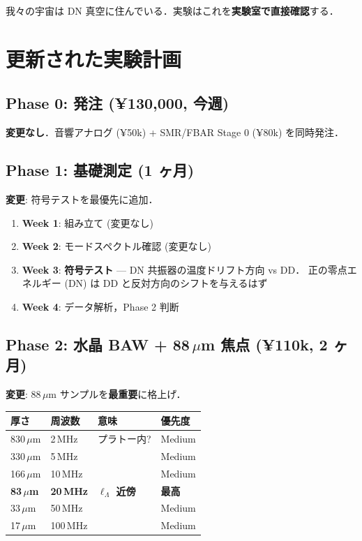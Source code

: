 \documentclass[11pt,a4paper]{article}
\begin{document}
我々の宇宙は DN 真空に住んでいる．実験はこれを\textbf{実験室で直接確認}する．

\section{更新された実験計画}

\subsection{Phase 0: 発注 (¥130,000, 今週)}

\textbf{変更なし}．音響アナログ (¥50k) + SMR/FBAR Stage 0 (¥80k) を同時発注．

\subsection{Phase 1: 基礎測定 (1 ヶ月)}

\textbf{変更}: 符号テストを最優先に追加．

\begin{enumerate}
\item \textbf{Week 1}: 組み立て (変更なし)
\item \textbf{Week 2}: モードスペクトル確認 (変更なし)
\item \textbf{Week 3}: \textbf{符号テスト} — DN 共振器の温度ドリフト方向 vs DD．
正の零点エネルギー (DN) は DD と反対方向のシフトを与えるはず
\item \textbf{Week 4}: データ解析，Phase 2 判断
\end{enumerate}

\subsection{Phase 2: 水晶 BAW + 88\,$\mu$m 焦点 (¥110k, 2 ヶ月)}

\textbf{変更}: 88\,$\mu$m サンプルを\textbf{最重要}に格上げ．

\begin{center}
\begin{tabular}{llll}
\toprule
厚さ & 周波数 & 意味 & 優先度 \\
\midrule
830\,$\mu$m & 2\,MHz & プラトー内? & Medium \\
330\,$\mu$m & 5\,MHz & & Medium \\
166\,$\mu$m & 10\,MHz & & Medium \\
\textbf{83\,$\mu$m} & \textbf{20\,MHz} & \textbf{$\ell_\Lambda$ 近傍} & \textbf{最高} \\
33\,$\mu$m & 50\,MHz & & Medium \\
17\,$\mu$m & 100\,MHz & & Medium \\
\bottomrule
\end{tabular}
\end{center}
\end{document}
